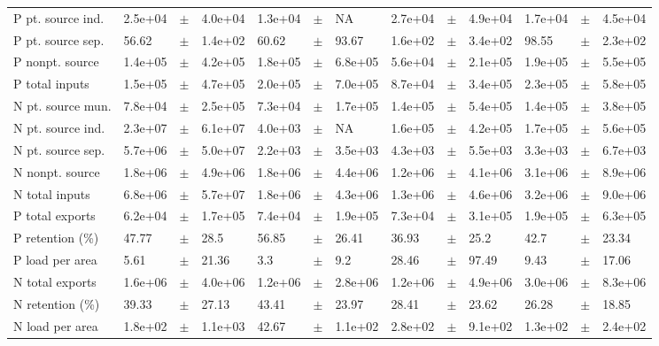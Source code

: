 \documentclass{article}
\begin{document}
\begin{landscape}
\begin{table}[!h]
\begin{tabular}{lllllllllllll}
P pt. source ind. & 2.5e+04 & $\pm$ & 4.0e+04 & 1.3e+04 & $\pm$ & NA & 2.7e+04 & $\pm$ & 4.9e+04 & 1.7e+04 & $\pm$ & 4.5e+04\\
P pt. source sep. & 56.62 & $\pm$ & 1.4e+02 & 60.62 & $\pm$ & 93.67 & 1.6e+02 & $\pm$ & 3.4e+02 & 98.55 & $\pm$ & 2.3e+02\\
\addlinespace
P nonpt. source & 1.4e+05 & $\pm$ & 4.2e+05 & 1.8e+05 & $\pm$ & 6.8e+05 & 5.6e+04 & $\pm$ & 2.1e+05 & 1.9e+05 & $\pm$ & 5.5e+05\\
P total inputs & 1.5e+05 & $\pm$ & 4.7e+05 & 2.0e+05 & $\pm$ & 7.0e+05 & 8.7e+04 & $\pm$ & 3.4e+05 & 2.3e+05 & $\pm$ & 5.8e+05\\
N pt. source mun. & 7.8e+04 & $\pm$ & 2.5e+05 & 7.3e+04 & $\pm$ & 1.7e+05 & 1.4e+05 & $\pm$ & 5.4e+05 & 1.4e+05 & $\pm$ & 3.8e+05\\
N pt. source ind. & 2.3e+07 & $\pm$ & 6.1e+07 & 4.0e+03 & $\pm$ & NA & 1.6e+05 & $\pm$ & 4.2e+05 & 1.7e+05 & $\pm$ & 5.6e+05\\
N pt. source sep. & 5.7e+06 & $\pm$ & 5.0e+07 & 2.2e+03 & $\pm$ & 3.5e+03 & 4.3e+03 & $\pm$ & 5.5e+03 & 3.3e+03 & $\pm$ & 6.7e+03\\
\addlinespace
N nonpt. source & 1.8e+06 & $\pm$ & 4.9e+06 & 1.8e+06 & $\pm$ & 4.4e+06 & 1.2e+06 & $\pm$ & 4.1e+06 & 3.1e+06 & $\pm$ & 8.9e+06\\
N total inputs & 6.8e+06 & $\pm$ & 5.7e+07 & 1.8e+06 & $\pm$ & 4.3e+06 & 1.3e+06 & $\pm$ & 4.6e+06 & 3.2e+06 & $\pm$ & 9.0e+06\\
P total exports & 6.2e+04 & $\pm$ & 1.7e+05 & 7.4e+04 & $\pm$ & 1.9e+05 & 7.3e+04 & $\pm$ & 3.1e+05 & 1.9e+05 & $\pm$ & 6.3e+05\\
P retention (\%) & 47.77 & $\pm$ & 28.5 & 56.85 & $\pm$ & 26.41 & 36.93 & $\pm$ & 25.2 & 42.7 & $\pm$ & 23.34\\
P load per area & 5.61 & $\pm$ & 21.36 & 3.3 & $\pm$ & 9.2 & 28.46 & $\pm$ & 97.49 & 9.43 & $\pm$ & 17.06\\
\addlinespace
N total exports & 1.6e+06 & $\pm$ & 4.0e+06 & 1.2e+06 & $\pm$ & 2.8e+06 & 1.2e+06 & $\pm$ & 4.9e+06 & 3.0e+06 & $\pm$ & 8.3e+06\\
N retention (\%) & 39.33 & $\pm$ & 27.13 & 43.41 & $\pm$ & 23.97 & 28.41 & $\pm$ & 23.62 & 26.28 & $\pm$ & 18.85\\
N load per area & 1.8e+02 & $\pm$ & 1.1e+03 & 42.67 & $\pm$ & 1.1e+02 & 2.8e+02 & $\pm$ & 9.1e+02 & 1.3e+02 & $\pm$ & 2.4e+02\\
\bottomrule
\end{tabular}
\end{table}
\end{landscape}
\end{document}
